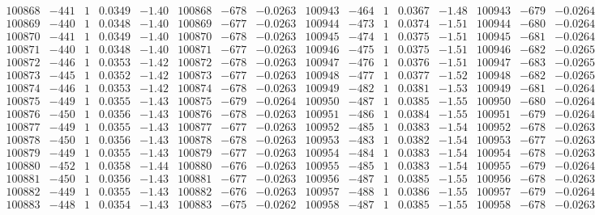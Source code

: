 \documentclass[11pt,reqno,a4letter]{article}
\numberwithin{figure}{section}
\numberwithin{table}{section}
\theoremstyle{plain}
\numberwithin{theorem}{section}
\theoremstyle{definition}
\begin{document}
\begin{table}[ht!]
\begin{equation*}
{\begin{array}{ccccc|ccc||ccccc|ccc}
100868 & -441 & 1 & 0.0349 & -1.40 & 100868 & -678 & -0.0263 & 100943 & -464 & 1 & 0.0367 & -1.48 & 100943 & -679 & -0.0264  \\
100869 & -440 & 1 & 0.0348 & -1.40 & 100869 & -677 & -0.0263 & 100944 & -473 & 1 & 0.0374 & -1.51 & 100944 & -680 & -0.0264  \\
100870 & -441 & 1 & 0.0349 & -1.40 & 100870 & -678 & -0.0263 & 100945 & -474 & 1 & 0.0375 & -1.51 & 100945 & -681 & -0.0264  \\
100871 & -440 & 1 & 0.0348 & -1.40 & 100871 & -677 & -0.0263 & 100946 & -475 & 1 & 0.0375 & -1.51 & 100946 & -682 & -0.0265  \\
100872 & -446 & 1 & 0.0353 & -1.42 & 100872 & -678 & -0.0263 & 100947 & -476 & 1 & 0.0376 & -1.51 & 100947 & -683 & -0.0265  \\
100873 & -445 & 1 & 0.0352 & -1.42 & 100873 & -677 & -0.0263 & 100948 & -477 & 1 & 0.0377 & -1.52 & 100948 & -682 & -0.0265  \\
100874 & -446 & 1 & 0.0353 & -1.42 & 100874 & -678 & -0.0263 & 100949 & -482 & 1 & 0.0381 & -1.53 & 100949 & -681 & -0.0264  \\
100875 & -449 & 1 & 0.0355 & -1.43 & 100875 & -679 & -0.0264 & 100950 & -487 & 1 & 0.0385 & -1.55 & 100950 & -680 & -0.0264  \\
100876 & -450 & 1 & 0.0356 & -1.43 & 100876 & -678 & -0.0263 & 100951 & -486 & 1 & 0.0384 & -1.55 & 100951 & -679 & -0.0264  \\
100877 & -449 & 1 & 0.0355 & -1.43 & 100877 & -677 & -0.0263 & 100952 & -485 & 1 & 0.0383 & -1.54 & 100952 & -678 & -0.0263  \\
100878 & -450 & 1 & 0.0356 & -1.43 & 100878 & -678 & -0.0263 & 100953 & -483 & 1 & 0.0382 & -1.54 & 100953 & -677 & -0.0263  \\
100879 & -449 & 1 & 0.0355 & -1.43 & 100879 & -677 & -0.0263 & 100954 & -484 & 1 & 0.0383 & -1.54 & 100954 & -678 & -0.0263  \\
100880 & -452 & 1 & 0.0358 & -1.44 & 100880 & -676 & -0.0263 & 100955 & -485 & 1 & 0.0383 & -1.54 & 100955 & -679 & -0.0264  \\
100881 & -450 & 1 & 0.0356 & -1.43 & 100881 & -677 & -0.0263 & 100956 & -487 & 1 & 0.0385 & -1.55 & 100956 & -678 & -0.0263  \\
100882 & -449 & 1 & 0.0355 & -1.43 & 100882 & -676 & -0.0263 & 100957 & -488 & 1 & 0.0386 & -1.55 & 100957 & -679 & -0.0264  \\
100883 & -448 & 1 & 0.0354 & -1.43 & 100883 & -675 & -0.0262 & 100958 & -487 & 1 & 0.0385 & -1.55 & 100958 & -678 & -0.0263  \\

\end{array}}
\end{equation*}
\end{table}
\end{document}
